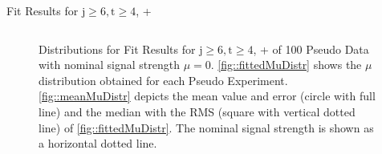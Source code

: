 \begin{frame}{Fit Results for $\text{j}\geq 6,\text{t}\geq 4$, \ttbarH \bbbar + \ttbar\bbbar}
\vskip-0.5cm
\begin{figure}
$\quad$
\caption[Distributions for Fit Results for $\text{j}\geq 6,\text{t}\geq 4$, \ttbarH \bbbar + \ttbar\bbbar of 100 Pseudo Data with nominal signal strength $\mu=0$]{Distributions for Fit Results for $\text{j}\geq 6,\text{t}\geq 4$, \ttbarH \bbbar + \ttbar\bbbar of 100 Pseudo Data with nominal signal strength $\mu=0$.
\ref{fig::fittedMuDistr} shows the $\mu$ distribution obtained for each Pseudo Experiment.
\ref{fig::meanMuDistr} depicts the mean value and error (circle with full line) and the median with the RMS (square with vertical dotted line) of \ref{fig::fittedMuDistr}.
The nominal signal strength is shown as a horizontal dotted line. }
\end{figure}
\end{frame}

